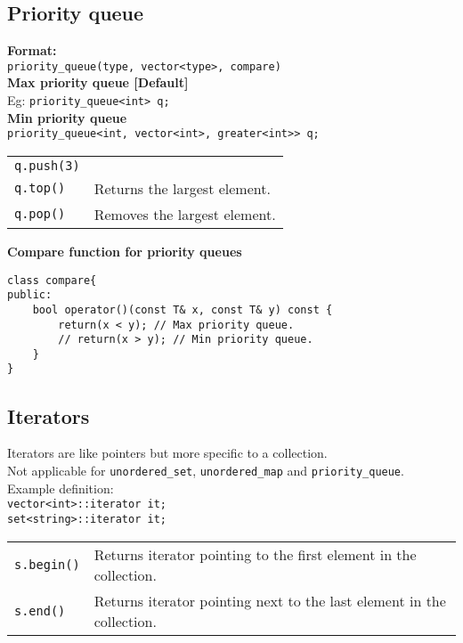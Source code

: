 \begin{minipage}{\linewidth}

\subsection{Priority queue}
\textbf{Format:}\\
\texttt{priority\_queue(type, vector<type>, compare)}\\
\textbf{Max priority queue [Default]}\\
Eg: \texttt{priority\_queue<int> q;}\\
\textbf{Min priority queue}\\
\texttt{priority\_queue<int, vector<int>, greater<int>> q;}

\begin{tabularx}{\linewidth}{lX}
\texttt{q.push(3)} & \\
\texttt{q.top()} & Returns the largest element.\\
\texttt{q.pop()} & Removes the largest element.
\end{tabularx}

\vspace{6pt}

\textbf{Compare function for priority queues}


\begin{verbatim}
class compare{
public:
    bool operator()(const T& x, const T& y) const {
        return(x < y); // Max priority queue.
        // return(x > y); // Min priority queue.
    }
}
\end{verbatim}

\subsection{Iterators}
Iterators are like pointers but more specific to a collection.\\
Not applicable for \texttt{unordered\_set}, \texttt{unordered\_map} and \texttt{priority\_queue}.\\

Example definition: \\
\texttt{vector<int>::iterator it;}\\
\texttt{set<string>::iterator it;}\\

\begin{tabularx}{\linewidth}{lX}
\texttt{s.begin()} & Returns iterator pointing to the first element in the collection.\\
\texttt{s.end()} & Returns iterator pointing next to the last element in the collection.
\end{tabularx}


\end{minipage}
